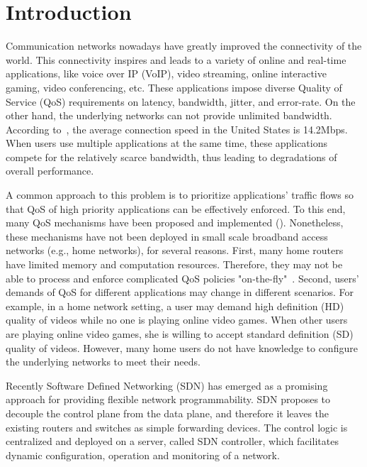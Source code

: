 \section{Introduction}
\label{sect:intro}

Communication networks nowadays have greatly improved the connectivity of the world. This connectivity
inspires and leads to a variety of online and real-time applications, like voice over IP (VoIP), video
streaming, online interactive gaming, video conferencing, etc. These applications impose diverse Quality
of Service (QoS) requirements on latency, bandwidth, jitter, and error-rate. On the other hand, the
underlying networks can not provide unlimited bandwidth. According to~\cite{akamai}, the average
connection speed in the United States is 14.2Mbps. When users use multiple applications at the same time,
these applications compete for the relatively scarce bandwidth, thus leading to degradations of overall
performance.

A common approach to this problem is to prioritize applications' traffic flows so that QoS of high
priority applications can be effectively enforced. To this end, many QoS mechanisms have been proposed and
implemented (). Nonetheless, these mechanisms have not been deployed in small scale broadband
access networks (e.g., home networks), for several reasons. First, many home routers have limited memory and
computation resources. Therefore, they may not be able to process and enforce complicated QoS policies
"on-the-fly"~\cite{But_Comm2018}. Second, users' demands of QoS for different applications may change in different
scenarios. For example, in a home network setting, a user may demand high definition (HD) quality of videos while
no one is playing online video games. When other users are playing online video games, she is willing to accept
standard definition (SD) quality of videos. However, many home users do not have knowledge to configure the
underlying networks to meet their needs.

Recently Software Defined Networking (SDN) has emerged as a promising approach for providing flexible network
programmability. SDN proposes to decouple the control plane from the data plane, and therefore it leaves the
existing routers and switches as simple forwarding devices. The control logic is centralized and deployed on a
server, called SDN controller, which facilitates dynamic configuration, operation and monitoring of a network.

